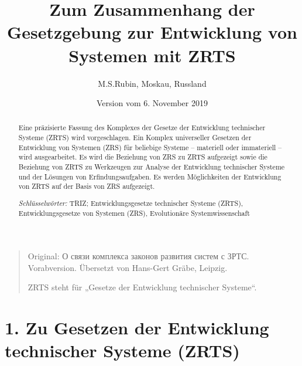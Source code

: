 \documentclass[11pt,a4paper]{article}
\title{Zum Zusammenhang der Gesetzgebung zur Entwicklung von Systemen mit ZRTS}
\author{M.S.Rubin, Moskau, Russland}
\date{Version vom 6. November 2019}
\begin{document}
\maketitle
\begin{quote}
  Original: \foreignlanguage{russian}{О связи комплекса законов развития
    систем с ЗРТС}.  Vorabversion. Übersetzt von Hans-Gert Gräbe, Leipzig.

  ZRTS steht für „Gesetze der Entwicklung technischer Systeme“. 
\end{quote}

\begin{abstract}
  Eine präzisierte Fassung des Komplexes der Gesetze der Entwicklung
  technischer Systeme (ZRTS) wird vorgeschlagen.  Ein Komplex universeller
  Gesetzen der Entwicklung von Systemen (ZRS) für beliebige Systeme --
  materiell oder immateriell -- wird ausgearbeitet. Es wird die Beziehung von
  ZRS zu ZRTS aufgezeigt sowie die Beziehung von ZRTS zu Werkzeugen zur
  Analyse der Entwicklung technischer Systeme und der Lösungen von
  Erfindungsaufgaben. Es werden Möglichkeiten der Entwicklung von ZRTS auf der
  Basis von ZRS aufgezeigt.

  \emph{Schlüsselwörter:} TRIZ; Entwicklungsgesetze technischer Systeme
  (ZRTS), Entwicklungsgesetze von Systemen (ZRS), Evolutionäre
  Systemwissenschaft
\end{abstract}

\section*{1. Zu Gesetzen der Entwicklung technischer Systeme (ZRTS)}
\end{document}
